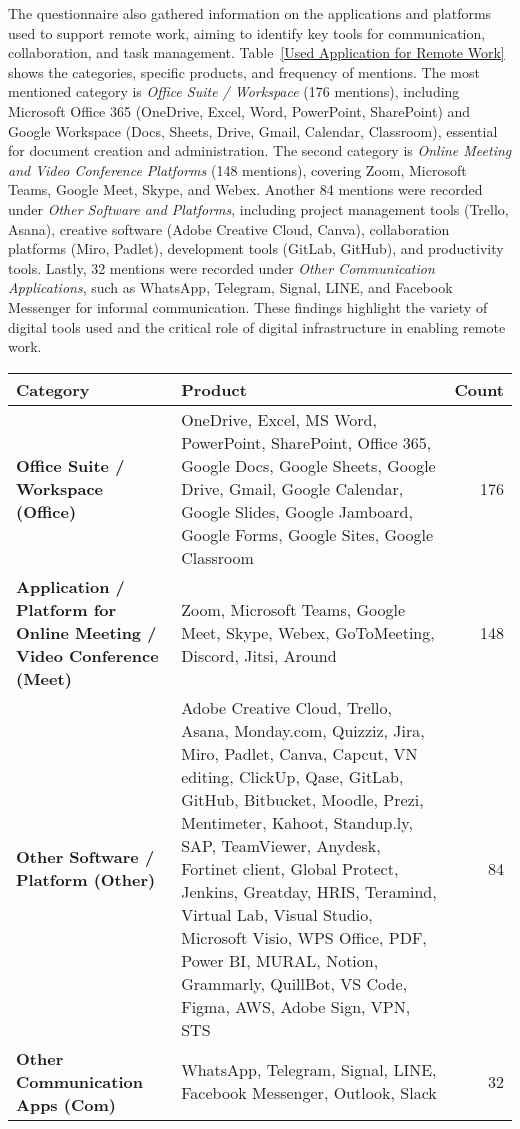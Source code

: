 \documentclass{infotel}
\begin{document}
The questionnaire also gathered information on the applications and platforms used to support remote work, aiming to identify key tools for communication, collaboration, and task management. Table~\ref{Used Application for Remote Work} shows the categories, specific products, and frequency of mentions. The most mentioned category is \textit{Office Suite / Workspace} (176 mentions), including Microsoft Office 365 (OneDrive, Excel, Word, PowerPoint, SharePoint) and Google Workspace (Docs, Sheets, Drive, Gmail, Calendar, Classroom), essential for document creation and administration. The second category is \textit{Online Meeting and Video Conference Platforms} (148 mentions), covering Zoom, Microsoft Teams, Google Meet, Skype, and Webex. Another 84 mentions were recorded under \textit{Other Software and Platforms}, including project management tools (Trello, Asana), creative software (Adobe Creative Cloud, Canva), collaboration platforms (Miro, Padlet), development tools (GitLab, GitHub), and productivity tools. Lastly, 32 mentions were recorded under \textit{Other Communication Applications}, such as WhatsApp, Telegram, Signal, LINE, and Facebook Messenger for informal communication. These findings highlight the variety of digital tools used and the critical role of digital infrastructure in enabling remote work.

\renewcommand{\arraystretch}{1.3}
\begin{table*}
	\centering
	\caption{Used Application for Remote Work}
	\label{Used Application for Remote Work}
	\begin{tabular}{p{} p{} r}
		\hline
		\textbf{Category} & \textbf{Product} & \textbf{Count} \\ 
		\hline
		\textbf{Office Suite / Workspace (Office)} & OneDrive, Excel, MS Word, PowerPoint, SharePoint, Office 365, Google Docs, Google Sheets, Google Drive, Gmail, Google Calendar, Google Slides, Google Jamboard, Google Forms, Google Sites, Google Classroom & 176 \\ 
		\textbf{Application / Platform for Online Meeting / Video Conference (Meet)} & Zoom, Microsoft Teams, Google Meet, Skype, Webex, GoToMeeting, Discord, Jitsi, Around & 148 \\ 
		\textbf{Other Software / Platform (Other)} & Adobe Creative Cloud, Trello, Asana, Monday.com, Quizziz, Jira, Miro, Padlet, Canva, Capcut, VN editing, ClickUp, Qase, GitLab, GitHub, Bitbucket, Moodle, Prezi, Mentimeter, Kahoot, Standup.ly, SAP, TeamViewer, Anydesk, Fortinet client, Global Protect, Jenkins, Greatday, HRIS, Teramind, Virtual Lab, Visual Studio, Microsoft Visio, WPS Office, PDF, Power BI, MURAL, Notion, Grammarly, QuillBot, VS Code, Figma, AWS, Adobe Sign, VPN, STS & 84 \\ 
		\textbf{Other Communication Apps (Com)} & WhatsApp, Telegram, Signal, LINE, Facebook Messenger, Outlook, Slack & 32 \\ 
		\hline
	\end{tabular}
\end{table*}
\end{document}
